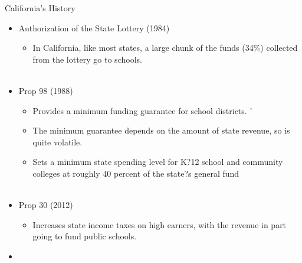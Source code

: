 \documentclass{beamer}
\begin{document}
\begin{frame}{California's History}
	\begin{itemize}
		\item Authorization of the State Lottery (1984)
		\begin{itemize}
			\item In California, like most states, a large chunk of the funds (34\%) collected from the lottery go to schools. \\~\\
		\end{itemize} 
		\item Prop 98 (1988)
		\begin{itemize}
					\item Provides a minimum funding guarantee for school districts. 
	'		\item The minimum guarantee depends on the amount of state revenue, so is quite volatile.
			\item Sets a minimum state spending level for K?12 school and community colleges at roughly 40 percent of the state?s general fund\\~\\
		\end{itemize}
		\item Prop 30 (2012)
		\begin{itemize}
			\item Increases state income taxes on high earners, with the revenue in part going to fund public schools.
		\end{itemize}
		\item \href{https://www.ppic.org/publication/school-finance/}{}
	\end{itemize}
\end{frame}
\end{document}

